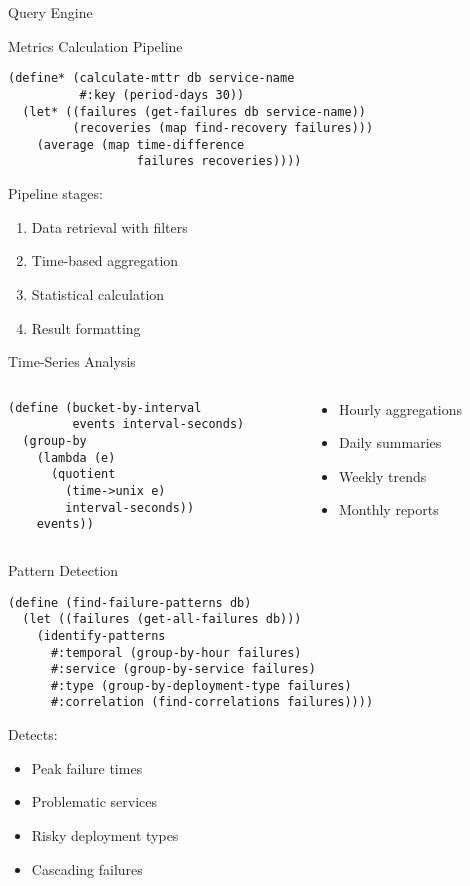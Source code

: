 \documentclass[presentation,aspectratio=169]{beamer}
\begin{document}
\begin{frame}[label={sec:org1022611},fragile]{Query Engine}
 \begin{block}{Metrics Calculation Pipeline}
\begin{verbatim}
(define* (calculate-mttr db service-name
          #:key (period-days 30))
  (let* ((failures (get-failures db service-name))
         (recoveries (map find-recovery failures)))
    (average (map time-difference
                  failures recoveries))))
\end{verbatim}

Pipeline stages:
\begin{enumerate}
\item Data retrieval with filters
\item Time-based aggregation
\item Statistical calculation
\item Result formatting
\end{enumerate}
\end{block}
\begin{block}{Time-Series Analysis}
\begin{columns}
\begin{column}{0.5\columnwidth}
\begin{verbatim}
(define (bucket-by-interval
         events interval-seconds)
  (group-by
    (lambda (e)
      (quotient
        (time->unix e)
        interval-seconds))
    events))
\end{verbatim}
\end{column}
\begin{column}{0.5\columnwidth}
\begin{itemize}
\item Hourly aggregations
\item Daily summaries
\item Weekly trends
\item Monthly reports
\end{itemize}
\end{column}
\end{columns}
\end{block}
\begin{block}{Pattern Detection}
\begin{verbatim}
(define (find-failure-patterns db)
  (let ((failures (get-all-failures db)))
    (identify-patterns
      #:temporal (group-by-hour failures)
      #:service (group-by-service failures)
      #:type (group-by-deployment-type failures)
      #:correlation (find-correlations failures))))
\end{verbatim}

Detects:
\begin{itemize}
\item Peak failure times
\item Problematic services
\item Risky deployment types
\item Cascading failures
\end{itemize}
\end{block}
\end{frame}
\end{document}
